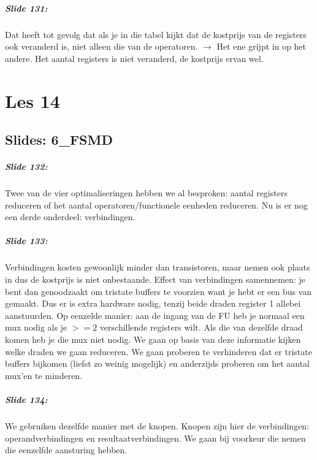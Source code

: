 \documentclass[10pt,a4paper]{book}
\begin{document}
\paragraph{Slide 131:} Dat heeft tot gevolg dat als je in die tabel kijkt dat de kostprijs van de registers ook veranderd is, niet alleen die van de operatoren. $\rightarrow$ Het ene grijpt in op het andere. Het aantal registers is niet veranderd, de kostprijs ervan wel.

\chapter{Les 14}

\section{Slides: 6\_FSMD}

\paragraph{Slide 132:} Twee van de vier optimaliseringen hebben we al besproken: aantal registers reduceren of het aantal operatoren/functionele eenheden reduceren. Nu is er nog een derde onderdeel: verbindingen.

\paragraph{Slide 133:} Verbindingen kosten gewoonlijk minder dan transistoren, maar nemen ook plaats in dus de kostprijs is niet onbestaande. Effect van verbindingen samennemen: je bent dan genoodzaakt om tristate buffers te voorzien want je hebt er een bus van gemaakt. Dus er is extra hardware nodig, tenzij beide draden register 1 allebei aanstuurden. Op eenzelde manier: aan de ingang van de FU heb je normaal een mux nodig als je $>=2$ verschillende registers wilt. Als die van dezelfde draad komen heb je die mux niet nodig. We gaan op basis van deze informatie kijken welke draden we gaan reduceren. We gaan proberen te verhinderen dat er tristate buffers bijkomen (liefst zo weinig mogelijk) en anderzijds proberen om het aantal mux'en te minderen.

\paragraph{Slide 134:} We gebruiken dezelfde manier met de knopen. Knopen zijn hier de verbindingen: operandverbindingen en resultaatverbindingen. We gaan bij voorkeur die nemen die eenzelfde aansturing hebben.
\end{document}
